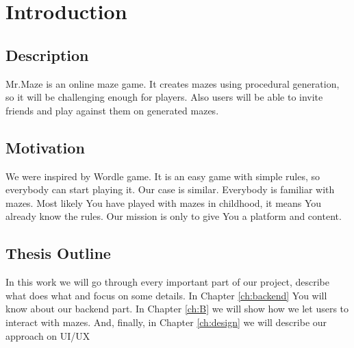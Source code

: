 \chapter{Introduction}\label{ch:intro}
\section{Description}
Mr.Maze is an online maze game. It creates mazes using procedural generation, so it will be challenging enough for players. Also users will be able to invite friends and play against them on generated mazes.
\section{Motivation}
We were inspired by Wordle game. It is an easy game with simple rules, so everybody can start playing it. Our case is similar. Everybody is familiar with mazes. Most likely You have played with mazes in childhood, it means You already know the rules. Our mission is only to give You a platform and content.
\section{Thesis Outline}
In this work we will go through every important part of our project, describe what does what and focus on some details. In Chapter \ref{ch:backend} You will know about our backend part. In Chapter \ref{ch:B} we will show how we let users to interact with mazes. And, finally, in Chapter \ref{ch:design} we will describe our approach on UI/UX